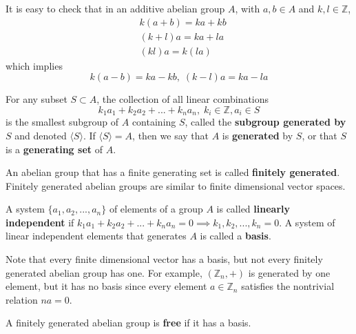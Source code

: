   \begin{proposition}
    It is easy to check that in an additive abelian group $A$, with $a, b \in A$ and $k, l \in \mathbb{Z}$, 
    \begin{align}
      & k (a + b) = k a + k b \\
      & (k + l) a = k a + l a \\
      & (k l) a = k (l a)
    \end{align}
    which implies
    \begin{equation}
      k(a - b) = k a - k b, \; (k - l) a = k a - l a
    \end{equation}
  \end{proposition}

  \begin{definition}
    For any subset $S \subset A$, the collection of all linear combinations 
    \begin{equation}
      k_1 a_1 + k_2 a_2 + ... + k_n a_n, \; k_i \in \mathbb{Z}, a_i \in S
    \end{equation}
    is the smallest subgroup of $A$ containing $S$, called the \textbf{subgroup generated by $S$} and denoted $\langle S \rangle$. If $\langle S \rangle = A$, then we say that $A$ is \textbf{generated} by $S$, or that $S$ is a \textbf{generating set} of $A$. 
  \end{definition}

  \begin{definition}
    An abelian group that has a finite generating set is called \textbf{finitely generated}. Finitely generated abelian groups are similar to finite dimensional vector spaces. 
  \end{definition}

  \begin{definition}
    A system $\{ a_1, a_2, ..., a_n\}$ of elements of a group $A$ is called \textbf{linearly independent} if $k_1 a_1 + k_2 a_2 + ... + k_n a_n = 0 \implies k_1, k_2, ..., k_n = 0$. A system of linear independent elements that generates $A$ is called a \textbf{basis}. 
  \end{definition}

  Note that every finite dimensional vector has a basis, but not every finitely generated abelian group has one. For example, $(\mathbb{Z}_n, +)$ is generated by one element, but it has no basis since every element $a \in \mathbb{Z}_n$ satisfies the nontrivial relation $n a = 0$. 

  \begin{definition}
    A finitely generated abelian group is \textbf{free} if it has a basis. 
  \end{definition}

